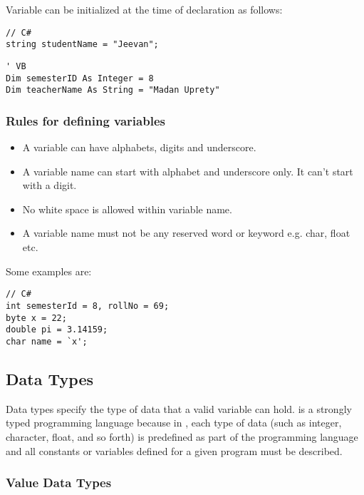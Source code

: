 Variable can be initialized at the time of declaration as follows:
\begin{lstlisting}[numbers=none]
// C#
string studentName = "Jeevan";
\end{lstlisting}

\begin{lstlisting}[style=vb, numbers=none]
' VB
Dim semesterID As Integer = 8
Dim teacherName As String = "Madan Uprety"
\end{lstlisting}
\subsubsection*{Rules for defining variables}
\begin{itemize}
	\item A variable can have alphabets, digits and underscore.

	\item A variable name can start with alphabet and underscore only. It can't start with a digit.

	\item No white space is allowed within variable name.

	\item A variable name must not be any reserved word or keyword e.g. char, float etc.
\end{itemize}

Some examples are:
\begin{lstlisting}[numbers=none]
// C#
int semesterId = 8, rollNo = 69;
byte x = 22;
double pi = 3.14159;
char name = `x';
\end{lstlisting}

\subsection{Data Types}

Data types specify the type of data that a valid {\cs} variable can hold. {\cs} is a strongly typed programming language because in {\cs}, each type of data (such as integer, character, float, and so forth) is predefined as part of the programming language and all constants or variables defined for a given program must be described.

\subsubsection*{Value Data Types}

